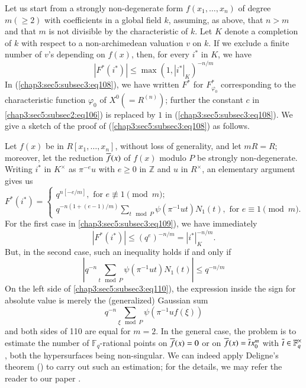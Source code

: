 Let us start from a strongly non-degenerate form
$f(x_{1},\ldots,x_{n})$ of degree $m(\geq 2)$ with coefficients in a
global field $k$, assuming, as above, that $n>m$ and that $m$ is not
divisible by the characteristic of $k$. Let $K$ denote a completion of
$k$ with respect to a non-archimedean valuation $v$ on $k$. If we
exclude a finite number of $v$'s depending on $f(x)$, then, for every
$i^{\ast}$ in $K$, we have
\begin{equation*}
  |F^{\ast}(i^{\ast})|\leq \max (1,|i^{\ast}|_{K})^{-n/m}
  \tag{108}\label{chap3:sec5:subsec3:eq108} 
\end{equation*}
In (\ref{chap3:sec5:subsec3:eq108}), we have written $F^{\ast}$ for
$F^{\ast}_{\varphi_{0}}$ corresponding to the characteristic function
$\varphi_{0}$ of $X^{0}(=R^{(n)})$; further the constant $c$ in
\ref{chap3:sec5:subsec2:eq106}) is replaced by $1$
in (\ref{chap3:sec5:subsec3:eq108}). We give a
sketch of the proof of (\ref{chap3:sec5:subsec3:eq108}) as follows.

Let $f(x)$ be in $R[x_{1},\ldots,x_{n}]$, without loss of generality,
and let $mR=R$; moreover, let the reduction $\overline{f}(x)$ of $f(x)$
modulo $P$ be strongly non-degenerate. Writing $i^{\ast}$ in
$K^{\times}$ as $\pi^{-e}u$ with $e\geq 0$ in $\mathbb{Z}$ and $u$ in
$R^{\times}$, an elementary argument gives us 
\begin{equation*}
  F^{\ast}(i^{\ast})=
  \begin{cases}
    q^{n[-e/m]}, \text{ for } e\not\equiv 1\pmod{m};\\
    q^{-n(1+(e-1)/m)}\sum\limits_{t\mod P}\psi(\pi^{-1}ut)N_{1}(t),\text{ for }
    e\equiv 1\pmod{m}.
  \end{cases}\tag{109}\label{chap3:sec5:subsec3:eq109}
\end{equation*}\pageoriginale
For the first case in \ref{chap3:sec5:subsec3:eq109}), we have immediately
$$
|F^{\ast}(i^{\ast})|\leq (q^{e})^{-n/m}=|i^{\ast}|^{-n/m}_{K}.
$$
But, in the second case, such an inequality holds if and only if
\begin{equation*}
|q^{-n}\sum_{t\mod P}\psi(\pi^{-1}ut)N_{1}(t)|\leq
q^{-n/m}\tag{110}\label{chap3:sec5:subsec3:eq110} 
\end{equation*}
On the left side of \ref{chap3:sec5:subsec3:eq110}), the expression
inside the sign for 
absolute value is merely the (generalized) Gaussian sum
$$
q^{-n}\sum_{\xi\mod P}\psi(\pi^{-1}uf(\xi))
$$
and both sides of {110} are equal for $m=2$. In the general
case, the problem is to estimate the number of
$\mathbb{F}_{q}$-rational points on $\overline{f}(x)=0$ or on
$\overline{f}(x)=\overline{t}x^{m}_{0}$ with $\overline{t}\in \mathbb{F}^{\times}_{q}$,
both the hypersurfaces being non-singular. We can indeed apply
Deligne's theorem (\cite{Del}) to carry out such an estimation; for the
details, we may refer the reader to our paper \cite{Igu 3}.
\newpage


